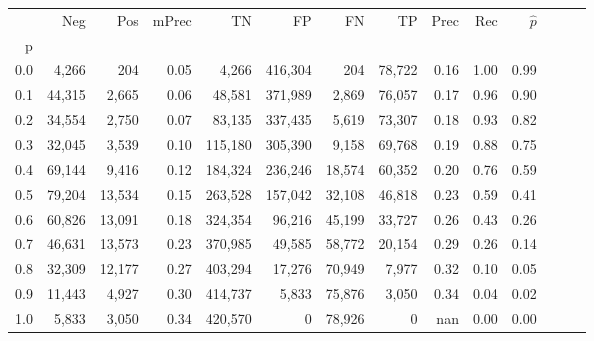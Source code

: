 \begin{tabular}{rrrrrrrrrrrrrr}
\toprule
{} &     Neg &     Pos & mPrec &       TN &       FP &      FN &      TP &  Prec &   Rec & $\hat{p}$ \\
p   &         &         &       &          &          &         &         &       &       &           \\
\midrule
0.0 &   4,266 &     204 &  0.05 &    4,266 &  416,304 &     204 &  78,722 &  0.16 &  1.00 &      0.99 \\
0.1 &  44,315 &   2,665 &  0.06 &   48,581 &  371,989 &   2,869 &  76,057 &  0.17 &  0.96 &      0.90 \\
0.2 &  34,554 &   2,750 &  0.07 &   83,135 &  337,435 &   5,619 &  73,307 &  0.18 &  0.93 &      0.82 \\
0.3 &  32,045 &   3,539 &  0.10 &  115,180 &  305,390 &   9,158 &  69,768 &  0.19 &  0.88 &      0.75 \\
0.4 &  69,144 &   9,416 &  0.12 &  184,324 &  236,246 &  18,574 &  60,352 &  0.20 &  0.76 &      0.59 \\
0.5 &  79,204 &  13,534 &  0.15 &  263,528 &  157,042 &  32,108 &  46,818 &  0.23 &  0.59 &      0.41 \\
0.6 &  60,826 &  13,091 &  0.18 &  324,354 &   96,216 &  45,199 &  33,727 &  0.26 &  0.43 &      0.26 \\
0.7 &  46,631 &  13,573 &  0.23 &  370,985 &   49,585 &  58,772 &  20,154 &  0.29 &  0.26 &      0.14 \\
0.8 &  32,309 &  12,177 &  0.27 &  403,294 &   17,276 &  70,949 &   7,977 &  0.32 &  0.10 &      0.05 \\
0.9 &  11,443 &   4,927 &  0.30 &  414,737 &    5,833 &  75,876 &   3,050 &  0.34 &  0.04 &      0.02 \\
1.0 &   5,833 &   3,050 &  0.34 &  420,570 &        0 &  78,926 &       0 &   nan &  0.00 &      0.00 \\
\bottomrule
\end{tabular}

